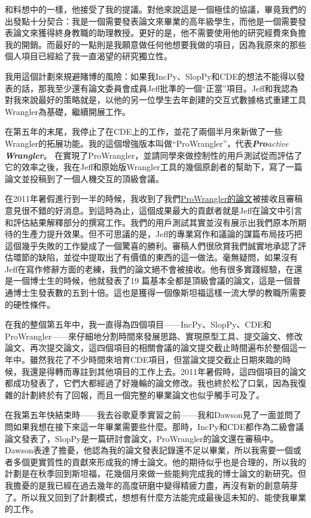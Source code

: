 \documentclass[12pt,UTF8,nofonts]{book}
\begin{document}
和料想中的一樣，他接受了我的提議。對他來說這是一個極佳的協議，畢竟我們的出發點十分契合：我是一個需要發表論文來畢業的高年級學生，而他是一個需要發表論文來獲得終身教職的助理教授。更好的是，他不需要使用他的研究經費來負擔我的開銷。而最好的一點則是我願意做任何他想要我做的項目，因為我原來的那些個人項目已經給了我一直渴望的研究獨立性。

我用這個計劃來規避賭博的風險：如果我IncPy、SlopPy和CDE的想法不能得以發表的話，那我至少還有論文委員會成員Jeff批準的一個“正當”項目。Jeff和我認為對我來說最好的策略就是，以他的另一位學生去年創建的交互式數據格式重建工具Wrangler為基礎，繼續開展工作。

在第五年的末尾，我停止了在CDE上的工作，並花了兩個半月來新做了一些Wrangler的拓展功能。我的這個增強版本叫做“ProWrangler”，代表\emph{\textbf{Pro}active \textbf{Wrangler}}。 在實現了ProWrangler，並請同學來做控制性的用戶測試從而評估了它的效率之後，我在Jeff和原始版Wrangler工具的幾個原創者的幫助下，寫了一篇論文並投稿到了一個人機交互的頂級會議。

在2011年暑假進行到一半的時候，我收到了我們\href{http://www.pgbovine.net/projects/pubs/prowrangler_uist11_camera_ready.pdf}{ProWrangler的論文}被接收且審稿意見很不錯的好消息。到這時為止，這個成果最大的貢獻者就是Jeff在論文中引言和評估結果解釋部分的撰寫工作。我們的用戶測試其實並沒有展示出我們原本所期待的生產力提升效果。但不可思議的是，Jeff的專業寫作和議論的謀篇布局技巧把這個幾乎失敗的工作變成了一個驚喜的勝利。審稿人們很欣賞我們誠實地承認了評估環節的缺陷，並從中提取出了有價值的東西的這一做法。毫無疑問，如果沒有Jeff在寫作修辭方面的老練，我們的論文絕不會被接收。他有很多實踐經驗，在還是一個博士生的時候，他就發表了19 篇基本全都是頂級會議的論文，這是一個普通博士生發表數的五到十倍。這也是獲得一個像斯坦福這樣一流大學的教職所需要的硬性條件。

\breakline

在我的整個第五年中，我一直得為四個項目——IncPy、SlopPy、CDE和ProWrangler——來仔細地分割時間來發展思路、實現原型工具、提交論文、修改論文、再次提交論文，這四個項目的相關會議的論文提交截止時間遍布於整個這一年中。雖然我花了不少時間來培育CDE項目，但當論文提交截止日期來臨的時候，我還是得轉而專註到其他項目的工作上去。2011年暑假時，這四個項目的論文都成功發表了，它們大都經過了好幾輪的論文修改。我也終於松了口氣，因為我復雜的計劃終於有了回報，而且一個完整的畢業論文也似乎觸手可及了。


在我第五年快結束時——我去谷歌夏季實習之前——我和Dawson見了一面並問了問如果我想在接下來這一年畢業需要些什麼。那時，IncPy和CDE都作為二級會議論文發表了，SlopPy是一篇研討會論文，ProWrangler的論文還在審稿中。Dawson表達了擔憂，他認為我的論文發表記錄還不足以畢業，所以我需要一個或者多個更實質性的貢獻來形成我的博士論文。他的期待似乎也是合理的，所以我的計劃是在秋季回到斯坦福，花幾個月來做一些能夠完成我的博士論文的新研究。但我擔憂的是我已經在過去幾年的高度研磨中變得精疲力盡，再沒有新的創意萌芽了。所以我又回到了計劃模式，想想有什麼方法能完成最後這未知的、能使我畢業的工作。
\end{document}
